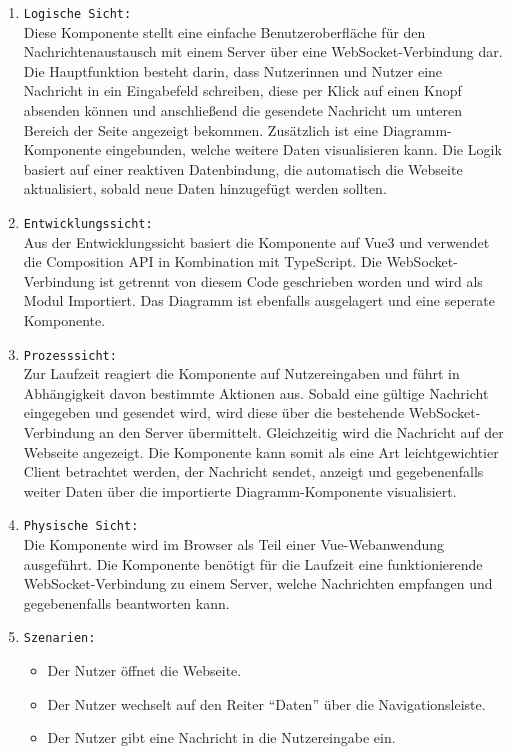 \begin{enumerate}
  \item \texttt{Logische Sicht:} \\
  Diese Komponente stellt eine einfache Benutzeroberfläche für den Nachrichtenaustausch mit einem Server
  über eine WebSocket-Verbindung dar.
  Die Hauptfunktion besteht darin, dass Nutzerinnen und Nutzer eine Nachricht
  in ein Eingabefeld schreiben, diese per Klick auf einen Knopf absenden können und 
  anschließend die gesendete Nachricht um unteren Bereich der Seite angezeigt bekommen.
  Zusätzlich ist eine Diagramm-Komponente eingebunden, 
  welche weitere Daten visualisieren kann.
  Die Logik basiert auf einer reaktiven Datenbindung, die automatisch die Webseite aktualisiert,
  sobald neue Daten hinzugefügt werden sollten.
  \item \texttt{Entwicklungssicht:} \\
  Aus der Entwicklungssicht basiert die Komponente auf Vue3 und verwendet die Composition API
  in Kombination mit TypeScript.
  Die WebSocket-Verbindung ist getrennt von diesem Code geschrieben worden und wird als Modul Importiert.
  Das Diagramm ist ebenfalls ausgelagert und eine seperate Komponente. 
  \item \texttt{Prozesssicht:} \\
  Zur Laufzeit reagiert die Komponente auf Nutzereingaben und führt in Abhängigkeit davon bestimmte
  Aktionen aus. Sobald eine gültige Nachricht eingegeben und gesendet wird, 
  wird diese über die bestehende WebSocket-Verbindung an den Server übermittelt. 
  Gleichzeitig wird die Nachricht auf der Webseite angezeigt.
  Die Komponente kann somit als eine Art leichtgewichtier Client betrachtet werden, 
  der Nachricht sendet, anzeigt und gegebenenfalls weiter Daten über die importierte Diagramm-Komponente visualisiert. 
  \item \texttt{Physische Sicht:} \\
  Die Komponente wird im Browser als Teil einer Vue-Webanwendung ausgeführt. 
  Die Komponente benötigt für die Laufzeit eine funktionierende WebSocket-Verbindung zu einem Server,
  welche Nachrichten empfangen und gegebenenfalls beantworten kann.
  \item \texttt{Szenarien:} \\
    \begin{itemize}
      \renewcommand{\labelitemi}{$\Rightarrow$}
    \item Der Nutzer öffnet die Webseite.
    \item Der Nutzer wechselt auf den Reiter ``Daten'' über die Navigationsleiste.
    \item Der Nutzer gibt eine Nachricht in die Nutzereingabe ein. 
    \end{itemize}
\end{enumerate}

